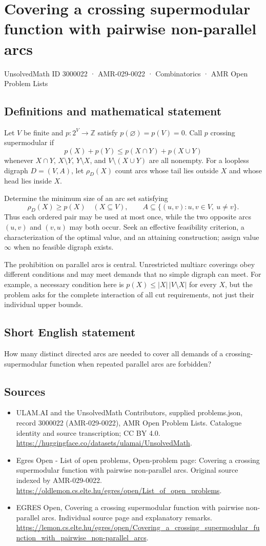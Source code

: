 \documentclass[11pt,a4paper]{article}
\begin{document}
\section*{Covering a crossing supermodular function with pairwise non-parallel arcs}\label{3000022}
{\small UnsolvedMath ID 3000022 · AMR-029-0022 · Combinatorics · AMR Open Problem Lists}
\subsection{Definitions and mathematical statement}
Let $V$ be finite and $p:2^V\to\mathbb Z$ satisfy
$p(\varnothing)=p(V)=0$. Call $p$ crossing supermodular if
\[
                 p(X)+p(Y)\le p(X\cap Y)+p(X\cup Y)
\]
whenever $X\cap Y$, $X\setminus Y$, $Y\setminus X$, and
$V\setminus(X\cup Y)$ are all nonempty.
For a loopless digraph $D=(V,A)$, let $\rho_D(X)$ count arcs whose
tail lies outside $X$ and whose head lies inside $X$.

Determine the minimum size of an arc set satisfying
\[
 \rho_D(X)\ge p(X)\quad(X\subseteq V),\qquad
 A\subseteq\{(u,v):u,v\in V,\ u\ne v\}.
\]
Thus each ordered pair may be used at most once, while the two opposite
arcs $(u,v)$ and $(v,u)$ may both occur. Seek an effective feasibility
criterion, a characterization of the optimal value, and an attaining
construction; assign value $\infty$ when no feasible digraph exists.

The prohibition on parallel arcs is central. Unrestricted multiarc
coverings obey different conditions and may meet demands that no
simple digraph can meet. For example, a necessary condition here is
$p(X)\le |X|\,|V\setminus X|$ for every $X$, but the problem asks for
the complete interaction of all cut requirements, not just their
individual upper bounds.
\subsection{Short English statement}
How many distinct directed arcs are needed to cover all demands
of a crossing-supermodular function when repeated parallel arcs are forbidden?
\subsection{Sources}
\begin{itemize}
\item[S1] ULAM.AI and the UnsolvedMath Contributors, supplied problems.json, record 3000022 (AMR-029-0022), AMR Open Problem Lists. Catalogue identity and source transcription; CC BY 4.0.
\url{https://huggingface.co/datasets/ulamai/UnsolvedMath}.
\item[S2] Egres Open - List of open problems, Open-problem page: Covering a crossing supermodular function with pairwise non-parallel arcs. Original source indexed by AMR-029-0022.
\url{https://oldlemon.cs.elte.hu/egres/open/List_of_open_problems}.
\item[S3] EGRES Open, Covering a crossing supermodular function with pairwise non-parallel arcs. Individual source page and explanatory remarks.
\url{https://lemon.cs.elte.hu/egres/open/Covering_a_crossing_supermodular_function_with_pairwise_non-parallel_arcs}.
\end{itemize}
\end{document}
